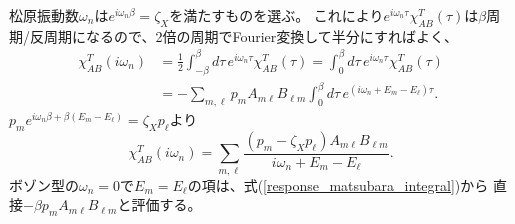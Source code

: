 \documentclass[a4paper,12pt]{jsarticle}
\begin{document}
松原振動数$\omega_n$は$e^{i\omega_n\beta}=\zeta_X$を満たすものを選ぶ。
これにより$e^{i\omega_n\tau}\chi^T_{AB}(\tau)$は$\beta$周期/反周期になるので、2倍の周期でFourier変換して半分にすればよく、
\begin{align}
  \chi^T_{AB}(i\omega_n)
    &=\frac{1}{2}\int_{-\beta}^{\beta} d\tau\,
        e^{i\omega_n\tau}\chi^T_{AB}(\tau)
     =\int_0^\beta d\tau\,e^{i\omega_n\tau}\chi^T_{AB}(\tau)\\
    &=-\sum_{m,\ell}p_m A_{m\ell}B_{\ell m}
        \int_0^\beta d\tau\,e^{(i\omega_n+E_m-E_\ell)\tau}.
    \label{response_matsubara_integral}
\end{align}
$p_m e^{i\omega_n\beta+\beta(E_m-E_\ell)}
=\zeta_X p_\ell$より
\begin{equation}
  \chi^T_{AB}(i\omega_n)
    =\sum_{m,\ell}
       \frac{(p_m-\zeta_X p_\ell) A_{m\ell}B_{\ell m}}
            {i\omega_n+E_m-E_\ell}.
    \label{response_matsubara_lehmann}
\end{equation}
ボゾン型の$\omega_n=0$で$E_m=E_\ell$の項は、式(\ref{response_matsubara_integral})から
直接$-\beta p_m A_{m\ell}B_{\ell m}$と評価する。
\end{document}
